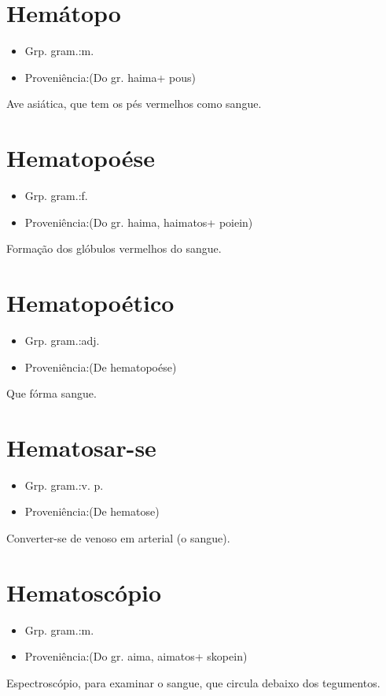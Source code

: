\documentclass{article}
\begin{document}
\section{Hemátopo}
\begin{itemize}
\item {Grp. gram.:m.}
\end{itemize}
\begin{itemize}
\item {Proveniência:(Do gr. \textunderscore haima\textunderscore  + \textunderscore pous\textunderscore )}
\end{itemize}
Ave asiática, que tem os pés vermelhos como sangue.
\section{Hematopoése}
\begin{itemize}
\item {Grp. gram.:f.}
\end{itemize}
\begin{itemize}
\item {Proveniência:(Do gr. \textunderscore haima\textunderscore , \textunderscore haimatos\textunderscore  + \textunderscore poiein\textunderscore )}
\end{itemize}
Formação dos glóbulos vermelhos do sangue.
\section{Hematopoético}
\begin{itemize}
\item {Grp. gram.:adj.}
\end{itemize}
\begin{itemize}
\item {Proveniência:(De \textunderscore hematopoése\textunderscore )}
\end{itemize}
Que fórma sangue.
\section{Hematosar-se}
\begin{itemize}
\item {Grp. gram.:v. p.}
\end{itemize}
\begin{itemize}
\item {Proveniência:(De \textunderscore hematose\textunderscore )}
\end{itemize}
Converter-se de venoso em arterial (o sangue).
\section{Hematoscópio}
\begin{itemize}
\item {Grp. gram.:m.}
\end{itemize}
\begin{itemize}
\item {Proveniência:(Do gr. \textunderscore aima\textunderscore , \textunderscore aimatos\textunderscore  + \textunderscore skopein\textunderscore )}
\end{itemize}
Espectroscópio, para examinar o sangue, que circula debaixo dos tegumentos.
\end{document}
